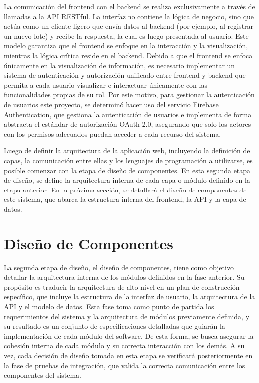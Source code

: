 La comunicación del frontend con el backend se realiza exclusivamente a través de llamadas a la API RESTful. La interfaz no contiene la lógica de negocio, sino que actúa como un cliente ligero que envía datos al backend (por ejemplo, al registrar un nuevo lote) y recibe la respuesta, la cual es luego presentada al usuario. Este modelo garantiza que el frontend se enfoque en la interacción y la visualización, mientras la lógica crítica reside en el backend. Debido a que el frontend se enfoca únicamente en la visualización de información, es necesario implementar un sistema de autenticación y autorización unificado entre frontend y backend que permita a cada usuario visualizar e interactuar únicamente con las funcionalidades propias de su rol. Por este motivo, para gestionar la autenticación de usuarios este proyecto, se determinó hacer uso del servicio Firebase Authentication, que gestiona la autenticación de usuarios e implementa de forma abstracta el estándar de autorización OAuth 2.0, asegurando que solo los actores con los permisos adecuados puedan acceder a cada recurso del sistema.

Luego de definir la arquitectura de la aplicación web, incluyendo la definición de capas, la comunicación entre ellas y los lenguajes de programación a utilizarse, es posible comenzar con la etapa de diseño de componentes. En esta segunda etapa de diseño, se define la arquitectura interna de cada capa o módulo definido en la etapa anterior. En la próxima sección, se detallará el diseño de componentes de este sistema, que abarca la estructura interna del frontend, la API y la capa de datos.

\section{Diseño de Componentes}
\label{sec:components-design}

La segunda etapa de diseño, el diseño de componentes, tiene como objetivo detallar la arquitectura interna de los módulos definidos en la fase anterior. Su propósito es traducir la arquitectura de alto nivel en un plan de construcción específico, que incluye la estructura de la interfaz de usuario, la arquitectura de la API y el modelo de datos. Esta fase toma como punto de partida los requerimientos del sistema y la arquitectura de módulos previamente definida, y su resultado es un conjunto de especificaciones detalladas que guiarán la implementación de cada módulo del software. De esta forma, se busca asegurar la cohesión interna de cada módulo y su correcta interacción con los demás. A su vez, cada decisión de diseño tomada en esta etapa se verificará posteriormente en la fase de pruebas de integración, que valida la correcta comunicación entre los componentes del sistema.

